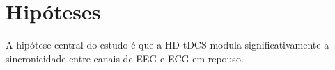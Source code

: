 \chapter{Hipóteses}
\label{chap:hipoteses}

A hipótese central do estudo é que a HD-tDCS modula significativamente a sincronicidade entre canais de EEG e ECG em repouso.